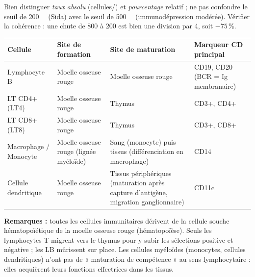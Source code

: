 \documentclass[11pt]{article}
\newcommand{\cle}[1]{{\popxbold\color{popdark}#1}}
\begin{document}
\begin{attention}
Bien distinguer \emph{taux absolu} (cellules/\si{\microliter}) et \emph{pourcentage} relatif ; ne pas confondre le seuil de \SI{200}{\per\microliter} (Sida) avec le seuil de \SI{500}{\per\microliter} (immunodépression modérée). Vérifier la cohérence : une chute de 800 à 200 est bien une division par 4, soit $-75\,\%$.
\end{attention}

\begin{corrige}
\begin{center}
\begin{tabularx}{\linewidth}{|l|X|X|X|}\hline
\rowcolor{popblueL}
\textbf{Cellule} & \textbf{Site de formation} & \textbf{Site de maturation} & \textbf{Marqueur CD principal} \\ \hline
Lymphocyte B & Moelle osseuse rouge & Moelle osseuse rouge & CD19, CD20 (BCR = Ig membranaire) \\ \hline
LT CD4+ (LT4) & Moelle osseuse rouge & Thymus & CD3+, CD4+ \\ \hline
LT CD8+ (LT8) & Moelle osseuse rouge & Thymus & CD3+, CD8+ \\ \hline
Macrophage / Monocyte & Moelle osseuse rouge (lignée myéloïde) & Sang (monocyte) puis tissus (différenciation en macrophage) & CD14 \\ \hline
Cellule dendritique & Moelle osseuse rouge & Tissus périphériques (maturation après capture d'antigène, migration ganglionnaire) & CD11c \\ \hline
\end{tabularx}
\end{center}

\textbf{Remarques :} toutes les cellules immunitaires dérivent de la cellule souche hématopoïétique de la moelle osseuse rouge (hématopoïèse). Seuls les lymphocytes T migrent vers le \cle{thymus} pour y subir les sélections positive et négative ; les LB mûrissent sur place. Les cellules myéloïdes (monocytes, cellules dendritiques) n'ont pas de « maturation de compétence » au sens lymphocytaire : elles acquièrent leurs fonctions effectrices dans les tissus.
\end{corrige}
\end{document}
